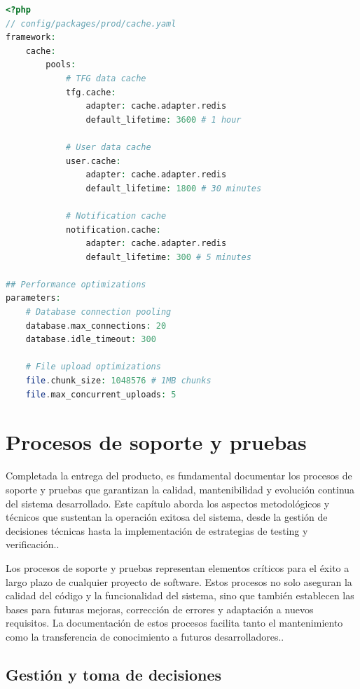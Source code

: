 \documentclass[12pt,a4paper,oneside]{report}
\begin{document}
\begin{lstlisting}[language=PHP]
<?php
// config/packages/prod/cache.yaml
framework:
    cache:
        pools:
            # TFG data cache
            tfg.cache:
                adapter: cache.adapter.redis
                default_lifetime: 3600 # 1 hour
                
            # User data cache  
            user.cache:
                adapter: cache.adapter.redis
                default_lifetime: 1800 # 30 minutes
                
            # Notification cache
            notification.cache:
                adapter: cache.adapter.redis
                default_lifetime: 300 # 5 minutes

## Performance optimizations
parameters:
    # Database connection pooling
    database.max_connections: 20
    database.idle_timeout: 300
    
    # File upload optimizations
    file.chunk_size: 1048576 # 1MB chunks
    file.max_concurrent_uploads: 5
\end{lstlisting}

\chapter{Procesos de soporte y
pruebas}\label{procesos-de-soporte-y-pruebas}
Completada la entrega del producto, es fundamental documentar los
procesos de soporte y pruebas que garantizan la calidad, mantenibilidad
y evolución continua del sistema desarrollado. Este capítulo aborda los
aspectos metodológicos y técnicos que sustentan la operación exitosa del
sistema, desde la gestión de decisiones técnicas hasta la implementación
de estrategias de testing y verificación..

Los procesos de soporte y pruebas representan elementos críticos para el
éxito a largo plazo de cualquier proyecto de software. Estos procesos no
solo aseguran la calidad del código y la funcionalidad del sistema, sino
que también establecen las bases para futuras mejoras, corrección de
errores y adaptación a nuevos requisitos. La documentación de estos
procesos facilita tanto el mantenimiento como la transferencia de
conocimiento a futuros desarrolladores..

\section{Gestión y toma de
decisiones}\label{gestiuxf3n-y-toma-de-decisiones}
\end{document}
